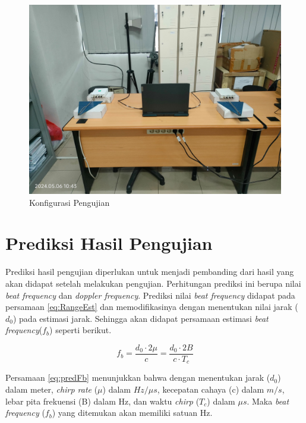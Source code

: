 \begin{figure}
	\begin{center}
		\includegraphics[scale=0.09]{pics/bab3/konfigurasiPengujian.jpg}
		\caption{Konfigurasi Pengujian}
		\label{img:konfigurasi}
	\end{center}
\end{figure}


\section{Prediksi Hasil Pengujian}

Prediksi hasil pengujian diperlukan untuk menjadi pembanding dari hasil yang akan didapat setelah melakukan pengujian. Perhitungan prediksi ini berupa nilai \textit{beat frequency} dan \textit{doppler frequency}. Prediksi nilai \textit{beat frequency} didapat pada persamaan \ref{eq:RangeEst} dan memodifikasinya dengan menentukan nilai jarak ($d_{0}$) pada estimasi jarak. Sehingga akan didapat persamaan estimasi \textit{beat frequency}($f_{b}$) seperti berikut.

\begin{equation}
	f_{b} = \frac{d_{0} \cdot 2 \mu}{c} = \frac{d_{0} \cdot 2B}{c \cdot T_{c}}
	\label{eq:predFb}
\end{equation}

Persamaan \ref{eq:predFb} menunjukkan bahwa dengan menentukan jarak ($d_{0}$) dalam meter, \textit{chirp rate} ($\mu$) dalam $Hz/\mu s$, kecepatan cahaya (c) dalam $m/s$, lebar pita frekuensi (B) dalam Hz, dan waktu \textit{chirp} ($T_{c}$) dalam $\mu s$. Maka \textit{beat frequency} ($f_{b}$) yang ditemukan akan memiliki satuan Hz.


